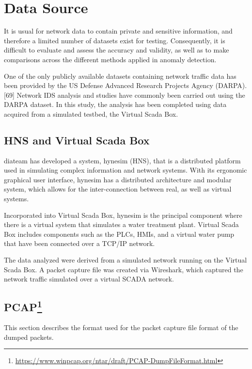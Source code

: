 \documentclass[11pt,]{article}
\begin{document}
\clearpage

\section{Data Source}\label{data-source}

It is usual for network data to contain private and sensitive
information, and therefore a limited number of datasets exist for
testing. Consequently, it is difficult to evaluate and assess the
accuracy and validity, as well as to make comparisons across the
different methods applied in anomaly detection.

One of the only publicly available datasets containing network traffic
data has been provided by the US Defense Advanced Research Projects
Agency (DARPA).{[}69{]} Network IDS analysis and studies have commonly
been carried out using the DARPA dataset. In this study, the analysis
has been completed using data acquired from a simulated testbed, the
Virtual Scada Box.

\subsection{HNS and Virtual Scada Box}\label{hns-and-virtual-scada-box}

diateam has developed a system, hynesim (HNS), that is a distributed
platform used in simulating complex information and network systems.
With its ergonomic graphical user interface, hynesim has a distributed
architecture and modular system, which allows for the inter-connection
between real, as well as virtual systems.

Incorporated into Virtual Scada Box, hynesim is the principal component
where there is a virtual system that simulates a water treatment plant.
Virtual Scada Box includes components such as the PLCs, HMIs, and a
virtual water pump that have been connected over a TCP/IP network.

The data analyzed were derived from a simulated network running on the
Virtual Scada Box. A packet capture file was created via Wireshark,
which captured the network traffic simulated over a virtual SCADA
network.

\subsection[PCAP]{PCAP\footnote{\url{https://www.winpcap.org/ntar/draft/PCAP-DumpFileFormat.html}}}\label{pcap2}

This section describes the format used for the packet capture file
format of the dumped packets.
\end{document}
